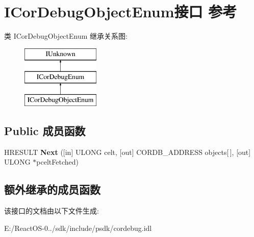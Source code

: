 \hypertarget{interface_i_cor_debug_object_enum}{}\section{I\+Cor\+Debug\+Object\+Enum接口 参考}
\label{interface_i_cor_debug_object_enum}
类 I\+Cor\+Debug\+Object\+Enum 继承关系图\+:\begin{figure}[H]
\begin{center}
\leavevmode
\includegraphics[height=3.000000cm]{interface_i_cor_debug_object_enum}
\end{center}
\end{figure}
\subsection*{Public 成员函数}
\begin{DoxyCompactItemize}
\item 
\mbox{\label{interface_i_cor_debug_object_enum_ab73dd139e9b3dd9b4f70bd67bfd9bb19}} 
H\+R\+E\+S\+U\+LT {\bfseries Next} (\mbox{[}in\mbox{]} U\+L\+O\+NG celt, \mbox{[}out\mbox{]} C\+O\+R\+D\+B\+\_\+\+A\+D\+D\+R\+E\+SS objects\mbox{[}$\,$\mbox{]}, \mbox{[}out\mbox{]} U\+L\+O\+NG $\ast$pcelt\+Fetched)
\end{DoxyCompactItemize}
\subsection*{额外继承的成员函数}


该接口的文档由以下文件生成\+:\begin{DoxyCompactItemize}
\item 
E\+:/\+React\+O\+S-\/0../sdk/include/psdk/cordebug.\+idl\end{DoxyCompactItemize}
